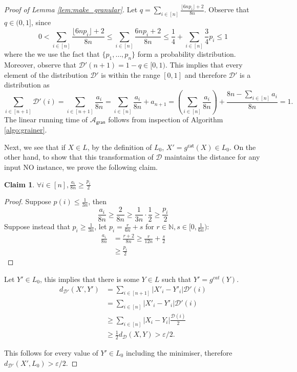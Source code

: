 \documentclass[11pt]{article}
\newtheorem{claim}[theorem]{Claim}
\newcommand{\N}{\mathbb{N}}
\newcommand{\sD}{\mathcal{D}}
\newcommand{\sA}{\mathcal{A}}
\begin{document}
\begin{proof}[Proof of Lemma \ref{lem:make_granular}]
Let $q=\sum_{i\in [n]}\frac{\lfloor 6n p_{i}\rfloor+2}{8n}$. Observe that $q \in (0,1]$, since 
\begin{equation*}
    0 < \sum_{i\in [n]} \frac{\lfloor 6n p_{i}\rfloor+2}{8n} \leq \sum_{i\in [n]}\frac{ 6n p_{i}+2}{8n} \leq \frac{1}{4} + \sum_{i\in [n]} \frac{3}{4} p_{i} \leq 1
\end{equation*}
where the we use the fact that $\{p_1, \dots, p_n \}$ form a probability distribution. Moreover, observe that $\sD'(n+1) = 1-q \in [0,1)$. This implies that every element of the distribution $\sD'$ is within the range $[0,1]$ and therefore $\sD'$ is a distribution as 
\begin{equation*}
    \sum_{i\in[n+1]}\sD'(i)=\sum_{i\in[n+1]}\frac{a_{i}}{8n}=\sum_{i\in[n]}\frac{a_{i}}{8n}+a_{n+1}=\left(\sum_{i\in[n]}\frac{a_{i}}{8n}\right)+\frac{8n-\sum_{i\in[n]}a_{i}}{8n}=1.
\end{equation*}
The linear running time of $\sA_{\textsf{gran}}$ follows from inspection of Algorithm \ref{algo:grainer}.

Next, we see that if $X\in L$, by the definition of $L_{0}$, $X'=g^{\mathsf{cat}}(X)\in L_{0}$. On the other hand, to show that this transformation of $\sD$ maintains the distance for any input NO instance, we prove the following claim.
\begin{claim}
    $\forall i\in[n], \frac{a_{i}}{8n}\geq \frac{p_{i}}{2}$ 
\end{claim}
\begin{proof}
    Suppose $p(i)\leq \frac{1}{3n}$, then
    \[
        \frac{a_{i}}{8n}\geq \frac{2}{8n} \geq \frac{1}{3n}\cdot \frac{1}{2} \geq \frac{p_{i}}{2}
    \]
    Suppose instead that $p_{i}\geq \frac{1}{3n}$, let $p_{i}=\frac{r}{6n}+s$ for $r\in \N, s\in[0,\frac{1}{6n})$:
     \[
    \begin{split}
        \frac{a_{i}}{8n}&=\frac{r+2}{8n} \geq \frac{r}{12n}+ \frac{s}{2}\\
        &\geq \frac{p_{i}}{2}
    \end{split}
    \]
\end{proof}

Let $Y'\in L_{0}$, this implies that there is some $Y\in L$ such that $Y'=g^{cat}(Y)$. 
\[\begin{split}
    d_{\sD'}(X',Y')&= \sum_{i\in [n+1]}|X'_{i}-Y'_{i}|\sD'(i)\\
    &= \sum_{i\in [n]}|X'_{i}-Y'_{i}|\sD'(i)\\
    &\geq \sum_{i\in [n]}|X_{i}-Y_{i}|\frac{\sD(i)}{2}\\
    &\geq \frac{1}{2}d_{\sD}(X,Y) > \varepsilon/2.
\end{split}\]

This follows for every value of $Y'\in L_{0}$ including the minimiser, therefore $d_{\sD'}(X',L_{0})>\varepsilon/2$.
\end{proof}
\end{document}

